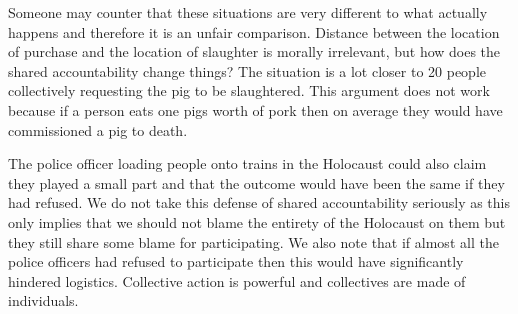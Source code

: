 Someone may counter that these situations are very different to what actually happens and therefore it is an unfair comparison. Distance between the location of purchase and the location of slaughter is morally irrelevant, but how does the shared accountability change things? The situation is a lot closer to 20 people collectively requesting the pig to be slaughtered. This argument does not work because if a person eats one pigs worth of pork then on average they would have commissioned a pig to death.

The police officer loading people onto trains in the Holocaust could also claim they played a small part and that the outcome would have been the same if they had refused. We do not take this defense of shared accountability seriously as this only implies that we should not blame the entirety of the Holocaust on them but they still share some blame for participating. We also note that if almost all the police officers had refused to participate then this would have significantly hindered logistics. Collective action is powerful and collectives are made of individuals.